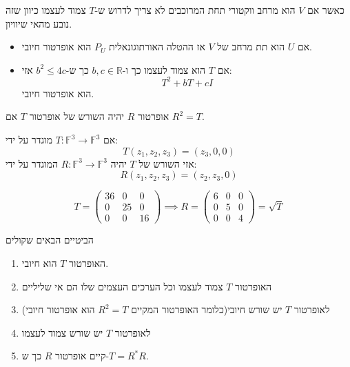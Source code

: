 \documentclass{tstextbook}
\begin{document}
\begin{remark}
כאשר אם \(V\) הוא מרחב ווקטורי תחת המרוכבים לא צריך לדרוש ש-\(T\) צמוד לעצמו כיוון שזה נובע מהאי שיוויון.

\end{remark}
\begin{example}
  \begin{itemize}
    \item אם \(U\) הוא תת מרחב של \(V\) אז ההטלה האורתוגונאלית \(P_{U}\) הוא אופרטור חיובי.
    \item אם \(T\) הוא צמוד לעצמו כך ו-\(b,c \in \mathbb{R}\) כך ש-\(b^{2}\leq 4c\) אזי:
$$T^{2}+bT+cI$$
הוא אופרטור חיובי.
  \end{itemize}
\end{example}
\begin{definition}
אופרטור \(R\) יהיה השורש של אופרטור \(T\) אם \(R^{2}=T\).

\end{definition}
\begin{example}
אם \(T:\mathbb{F} ^{3}\to \mathbb{F} ^{3}\) מוגדר על ידי:
$$T(z_{1},z_{2},z_{3})=(z_{3},0,0)$$
אזי השורש של \(T\) יהיה \(R:\mathbb{F} ^{3}\to \mathbb{F} ^{3}\) המוגדר על ידי:
$$R(z_{1},z_{2},z_{3})=(z_{2},z_{3},0)$$

\end{example}
\begin{example}
$$T=\begin{pmatrix}36 & 0 & 0 \\0 & 25 & 0 \\0 & 0 & 16\end{pmatrix}\implies R=\begin{pmatrix}6 & 0 & 0 \\0 & 5 & 0 \\0 & 0 & 4
\end{pmatrix}=\sqrt{ T }$$

\end{example}
\begin{proposition}
הביטיים הבאים שקולים

  \begin{enumerate}
    \item האופרטור \(T\) הוא חיובי. 


    \item האופרטור \(T\) צמוד לעצמו וכל הערכים העצמים שלו הם אי שליליים 


    \item לאופרטור \(T\)  יש שורש חיובי(כלומר האופרטור המקיים \(R^{2}=T\) הוא אופרטור חיובי) 


    \item לאופרטור \(T\) יש שורש צמוד לעצמו 


    \item קיים אופרטור \(R\) כך ש-\(T=R^{*}R\). 


  \end{enumerate}
\end{proposition}
\end{document}
